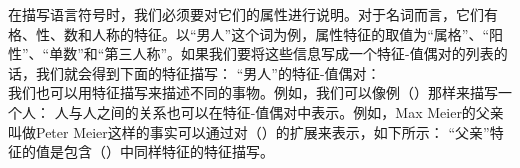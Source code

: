 在描写语言符号时，我们必须要对它们的属性进行说明。对于名词而言，它们有格、性、数和人称的特征。以“男人”这个词为例，属性特征的取值为“属格”、“阳性”、“单数”和“第三人称”。如果我们要将这些信息写成一个特征-值偶对的列表的话，我们就会得到下面的特征描写：
\eas
“男人”的特征-值偶对：\\
\zs
我们也可以用特征描写来描述不同的事物。例如，我们可以像例（）那样来描写一个人：
\ea
{}
\z
人与人之间的关系也可以在特征-值偶对中表示。例如，Max Meier的父亲叫做Peter Meier这样的事实可以通过对（）的扩展来表示，如下所示：
\ea
{}
\z
“\textsc{父亲}”特征的值是包含（）中同样特征的特征描写。

